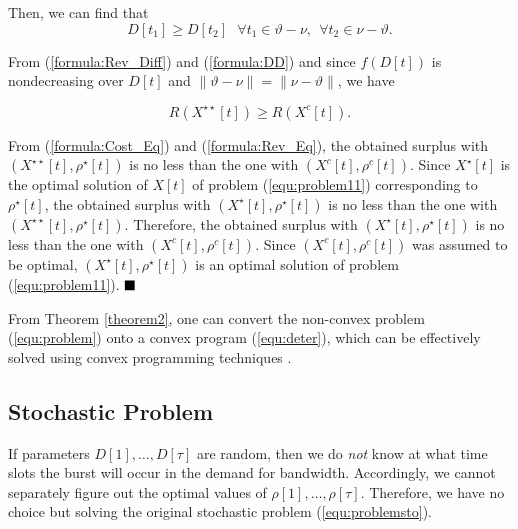 \documentclass[10pt,journal,compsoc]{IEEEtran}
\begin{document}
\noindent
Then, we can find that
\begin{equation}\label{formula:DD}
D[t_1]\geq D[t_2]\ \ \  \forall  t_1\in \vartheta-\nu,\ \    \forall t_2\in \nu- \vartheta.
\end{equation}

\noindent
From (\ref{formula:Rev_Diff})  and (\ref{formula:DD}) and since $f(D[t])$ is nondecreasing over $D[t]$ and $\|\vartheta-\nu\|=\|\nu- \vartheta\|$, we have


\begin{equation}\label{formula:Rev_Eq}
R(X^{\star \star}[t]) \geq R(X^c[t]).
\end{equation}

\noindent
From (\ref{formula:Cost_Eq}) and (\ref{formula:Rev_Eq}), the obtained surplus with $(X^{\star \star}[t],\rho^{\star}[t])$ is no less than the one with $(X^{c}[t],\rho^{c}[t])$. Since $X^{\star }[t]$ is the optimal solution of $X[t]$ of problem (\ref{equ:problem11}) corresponding to $\rho^{\star}[t]$, the obtained surplus with $(X^{\star}[t],\rho^{\star}[t])$ is no less than the one with $(X^{\star \star}[t],\rho^{\star}[t])$. Therefore, the obtained surplus with $(X^{\star}[t],\rho^{\star}[t])$ is no less than the one with $(X^{c}[t],\rho^{c}[t])$. Since $(X^{c}[t],\rho^{c}[t])$ was assumed to be optimal,
$(X^{\star}[t],\rho^{\star}[t])$ is an optimal solution of problem (\ref{equ:problem11}). $\hfill \blacksquare$






\vspace{0.2cm}

From Theorem \ref{theorem2}, one can convert the non-convex problem (\ref{equ:problem}) onto a convex program (\ref{equ:deter}), which can be effectively solved using convex programming techniques \cite{Boyd2004}.



\subsection{Stochastic Problem}\label{subsec:stochasticproblem}

If parameters $D[1], \ldots, D[\tau]$ are random, then we do \emph{not} know at what time slots the burst will occur in the demand for bandwidth. Accordingly, we cannot separately figure out the optimal values of $\rho[1], \ldots, \rho[\tau]$. Therefore, we have no choice but solving the original stochastic problem (\ref{equ:problemsto}).
\end{document}
